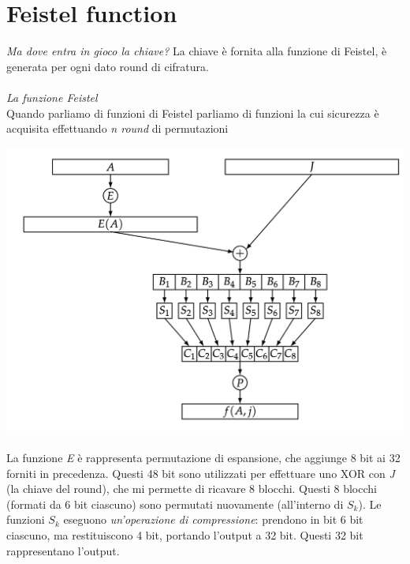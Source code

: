 \documentclass[11pt, oneside]{article}   	%
\begin{document}
\section*{Feistel function}
\emph{Ma dove entra in gioco la chiave?} La chiave è fornita alla funzione di Feistel, è generata per ogni dato round di cifratura.\\\\
\emph{La funzione Feistel}\\
Quando parliamo di funzioni di Feistel parliamo di funzioni la cui sicurezza è acquisita effettuando \emph{n round} di permutazioni
\begin{center}
\includegraphics[scale= 0.4]{feistel}
\end{center}
La funzione \emph{E} è rappresenta permutazione di espansione, che aggiunge 8 bit ai 32 forniti in precedenza. Questi 48 bit 
sono utilizzati per effettuare uno XOR con \emph{J} (la chiave del round), che mi permette di ricavare 8 blocchi.
Questi 8 blocchi (formati da 6 bit ciascuno) sono permutati nuovamente (all'interno di $S_k$).
Le funzioni $S_k$ eseguono \emph{un'operazione di compressione}: prendono in bit 6 bit ciascuno, ma restituiscono 4 bit, portando l'output a 32 bit. Questi 32 bit rappresentano l'output.
\end{document}
